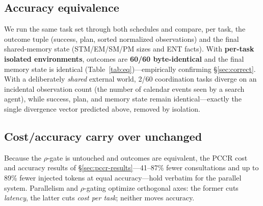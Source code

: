 \documentclass[10pt,twocolumn]{article}
\begin{document}
\subsection{Accuracy equivalence}\label{sec:eq}
We run the same task set through both schedules and compare, per task, the outcome
tuple (success, plan, sorted normalized observations) and the final shared-memory
state (STM/EM/SM/PM sizes and ENT facts). With \textbf{per-task isolated
environments}, outcomes are \textbf{60/60 byte-identical} and the final memory
state is identical (Table~\ref{tab:eq})---empirically confirming
\S\ref{sec:correct}. With a deliberately \emph{shared} external world, 2/60
coordination tasks diverge on an incidental observation count (the number of
calendar events seen by a search agent), while success, plan, and memory state
remain identical---exactly the single divergence vector predicted above, removed by
isolation.

\begin{table}[t]
\centering\small
{}
\caption{Parallel vs.\ sequential outcome equivalence ($C{=}4$, 60 tasks).
\textsuperscript{$\ast$}The two differ only on an incidental observation count of a
shared mutable resource; success/plan/memory identical.}
\label{tab:eq}
\end{table}

\subsection{Cost/accuracy carry over unchanged}
Because the $\rho$-gate is untouched and outcomes are equivalent, the PCCR cost and
accuracy results of \S\ref{sec:pccr-results}---41--87\% fewer consultations and up
to 89\% fewer injected tokens at equal accuracy---hold verbatim for the parallel
system. Parallelism and $\rho$-gating optimize orthogonal axes: the former cuts
\emph{latency}, the latter cuts \emph{cost per task}; neither moves accuracy.

\end{document}
